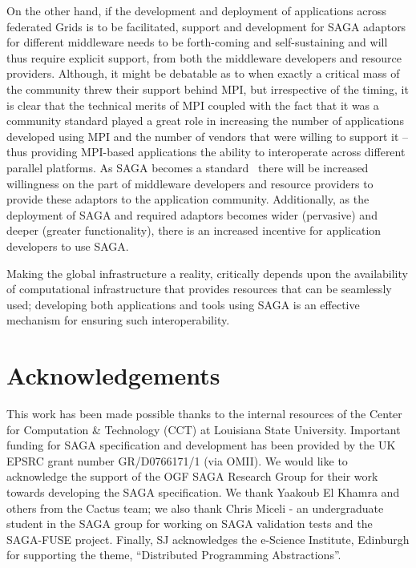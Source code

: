 \documentclass[conference,final]{IEEEtran}
\begin{document}
On the other hand, if the development and deployment of applications
across federated Grids is to be facilitated, support and development
for SAGA adaptors for different middleware needs to be forth-coming and
self-sustaining and will thus require explicit support, from both the
middleware developers and resource providers.  Although, it might be
debatable as to when exactly a critical mass of the community threw
their support behind MPI, but irrespective of the timing, it is clear
that the technical merits of MPI coupled with the fact that it was a
community standard played a great role in increasing the number of
applications developed using MPI and the number of vendors that were
willing to support it -- thus providing MPI-based applications the
ability to interoperate across different parallel platforms. As SAGA
becomes a standard~\cite{saga-uc, saga-req, saga-core} there will be
increased willingness on the part of middleware developers and
resource providers to provide these adaptors to the application
community.  Additionally, as the deployment of SAGA and required
adaptors becomes wider (pervasive) and deeper (greater functionality),
there is an increased incentive for application developers to use
SAGA.

Making the global infrastructure a reality, critically depends upon
the availability of computational infrastructure that provides
resources that can be seamlessly used; developing both applications
and tools using SAGA is an effective mechanism for ensuring such
interoperability.%

\section{Acknowledgements}

This work has been made possible thanks to the internal resources of
the Center for Computation \& Technology (CCT) at Louisiana State
University.  Important funding for SAGA specification and development
has been provided by the UK EPSRC grant number GR/D0766171/1 (via
OMII).  We would like to acknowledge the support of the OGF SAGA
Research Group for their work towards developing the SAGA
specification. We thank Yaakoub El Khamra and others from the Cactus
team; we also thank Chris Miceli - an undergraduate student in the
SAGA group for working on SAGA validation tests and the SAGA-FUSE
project. Finally, SJ acknowledges the e-Science Institute, Edinburgh
for supporting the theme, ``Distributed Programming Abstractions''.



\end{document}
